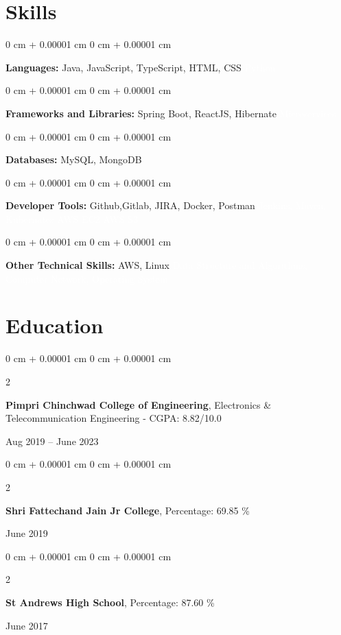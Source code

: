 \documentclass[10pt, letterpaper]{article}
\newenvironment{onecolentry}{
    \begin{adjustwidth}{
        0 cm + 0.00001 cm
    }{
        0 cm + 0.00001 cm
    }
}{
    \end{adjustwidth}
} %
\newenvironment{twocolentry}[2][]{
    \onecolentry
    \def\secondColumn{#2}
    \setcolumnwidth{\fill, 4.5 cm}
    \begin{paracol}{2}
}{
    \switchcolumn \raggedleft \secondColumn
    \end{paracol}
    \endonecolentry
} %
\begin{document}
\section{Skills}
        
        \begin{onecolentry}
            \textbf{Languages:} Java, JavaScript, TypeScript, HTML, CSS \textcolor{white}{Python}
        \end{onecolentry}


        \vspace{0.1 cm}

        \begin{onecolentry}
            \textbf{Frameworks and Libraries:} Spring Boot, ReactJS, Hibernate \textcolor{white}{Microservices}
        \end{onecolentry}
        
        \vspace{0.1 cm}

        \begin{onecolentry}
            \textbf{Databases:} MySQL, MongoDB \end{onecolentry}

        \vspace{0.1 cm}

        \begin{onecolentry}
            \textbf{Developer Tools:} Github,Gitlab, JIRA, Docker, Postman \textcolor{white}{Jenkins, Maven, Kubernates} \textcolor{white}{AWS EC2} \textcolor{white}{AWS S3} 
        \end{onecolentry}

        \vspace{0.1 cm}

        \begin{onecolentry}
            \textbf{Other Technical Skills:} AWS, Linux \textcolor{white}{Data Structure and Algorithms, Computer Network, Operating System}
        \end{onecolentry}

        \vspace{0.1 cm}

        \section{Education}
        
        \begin{twocolentry}{
            Aug 2019 – June 2023
        }
            \textbf{Pimpri Chinchwad College of Engineering}, Electronics \& Telecommunication Engineering -  CGPA: 8.82/10.0 
        \end{twocolentry}
        \begin{twocolentry}{
            June 2019 
        }
            \textbf{Shri Fattechand Jain Jr College},  Percentage: 69.85 \%
        \end{twocolentry}
        \begin{twocolentry}{
            June 2017 
        }
            \textbf{St Andrews High School},  Percentage: 87.60 \%
        \end{twocolentry}
\end{document}
